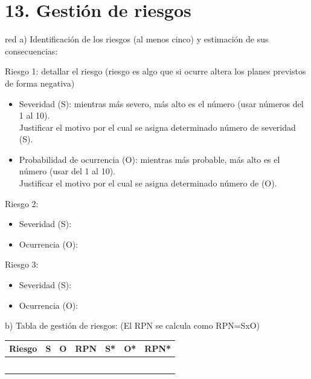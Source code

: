 \documentclass[
11pt, %
]{charter}
\begin{document}
\begin{table}[htpb]
\begin{tabularx}{\linewidth}{@{}|X|c|r|r|@{}}
\end{tabularx}%
\end{table}


\section{13. Gestión de riesgos}
\label{sec:riesgos}

\begin{consigna}{red}
a) Identificación de los riesgos (al menos cinco) y estimación de sus consecuencias:
 
Riesgo 1: detallar el riesgo (riesgo es algo que si ocurre altera los planes previstos de forma negativa)
\begin{itemize}
	\item Severidad (S): mientras más severo, más alto es el número (usar números del 1 al 10).\\
	Justificar el motivo por el cual se asigna determinado número de severidad (S).
	\item Probabilidad de ocurrencia (O): mientras más probable, más alto es el número (usar del 1 al 10).\\
	Justificar el motivo por el cual se asigna determinado número de (O). 
\end{itemize}   

Riesgo 2:
\begin{itemize}
	\item Severidad (S): 
	\item Ocurrencia (O):
\end{itemize}

Riesgo 3:
\begin{itemize}
	\item Severidad (S): 
	\item Ocurrencia (O):
\end{itemize}


b) Tabla de gestión de riesgos:      (El RPN se calcula como RPN=SxO)

\begin{table}[htpb]
\centering
\begin{tabularx}{\linewidth}{@{}|X|c|c|c|c|c|c|@{}}
\hline
\rowcolor[HTML]{C0C0C0} 
Riesgo & S & O & RPN & S* & O* & RPN* \\ \hline
       &   &   &     &    &    &      \\ \hline
       &   &   &     &    &    &      \\ \hline
       &   &   &     &    &    &      \\ \hline
       &   &   &     &    &    &      \\ \hline
       &   &   &     &    &    &      \\ \hline
\end{tabularx}%
\end{table}


\end{consigna}
\end{document}
